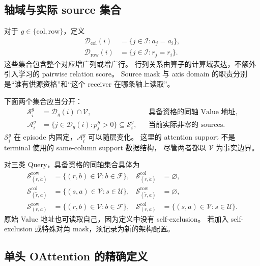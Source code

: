 \documentclass[11pt,UTF8,fontset=fandol]{ctexart}
\numberwithin{equation}{section}
\theoremstyle{definition}
\newcommand{\Rset}{\mathcal U}
\newcommand{\Fset}{\mathcal F}
\newcommand{\Vset}{\mathcal V}
\newcommand{\Iset}{\mathcal I}
\newcommand{\Sset}{\mathcal S}
\newcommand{\Dset}{\mathcal D}
\newcommand{\Fstar}{\widetilde r}
\newcommand{\Ustar}{\widetilde a}
\begin{document}
\subsection{轴域与实际 source 集合}
\label{subsec:A:domains}

对于 $g\in\{\mathrm{col},\mathrm{row}\}$，定义
\begin{equation}
 \begin{aligned}
  \Dset_{\mathrm{col}}(i)
   &=\{j\in\Iset:a_j=a_i\},\\
  \Dset_{\mathrm{row}}(i)
   &=\{j\in\Iset:r_j=r_i\}.
 \end{aligned}
 \label{eq:A:axis-domains}
\end{equation}
这些集合包含整个对应增广列或增广行。
行列关系由算子的计算域表达，不额外引入学习的 pairwise relation score。
Source mask 与 axis domain 的职责分别是“谁有供源资格”和“这个 receiver
在哪条轴上读取”。

下面两个集合应当分开：
\begin{equation}
 \begin{aligned}
  \Sset_i^g&=\Dset_g(i)\cap\Vset,
       &&\text{具备资格的同轴 Value 地址},\\
  \mathcal A_i^g&=\{j\in\Dset_g(i):p_j^S>0\}
       \subseteq\Sset_i^g,
       &&\text{当前实际非零的 sources}.
 \end{aligned}
 \label{eq:A:support-active}
\end{equation}
$\Sset_i^g$ 在 episode 内固定，$\mathcal A_i^g$ 可以随层变化。
这里的 attention support 不是 terminal 使用的 same-column support 数据结构，
尽管两者都以 $\Vset$ 为事实边界。

对三类 Query，具备资格的同轴集合具体为
\begin{equation}
 \begin{aligned}
  \Sset_{(r,\Ustar)}^{\mathrm{row}}
    &=\{(r,b)\in\Vset:b\in\Fset\},
  &\Sset_{(r,\Ustar)}^{\mathrm{col}}&=\varnothing,\\
  \Sset_{(\Fstar,a)}^{\mathrm{col}}
    &=\{(s,a)\in\Vset:s\in\Rset\},
  &\Sset_{(\Fstar,a)}^{\mathrm{row}}&=\varnothing,\\
  \Sset_{(r,a)}^{\mathrm{row}}
    &=\{(r,b)\in\Vset:b\in\Fset\},
  &\Sset_{(r,a)}^{\mathrm{col}}
    &=\{(s,a)\in\Vset:s\in\Rset\}.
 \end{aligned}
 \label{eq:A:query-domains}
\end{equation}
原始 Value 地址也可读取自己，因为定义中没有 self-exclusion。
若加入 self-exclusion 或特殊对角 mask，须记录为新的架构配置。

\subsection{单头 OAttention 的精确定义}
\label{subsec:A:single-head}
\end{document}
